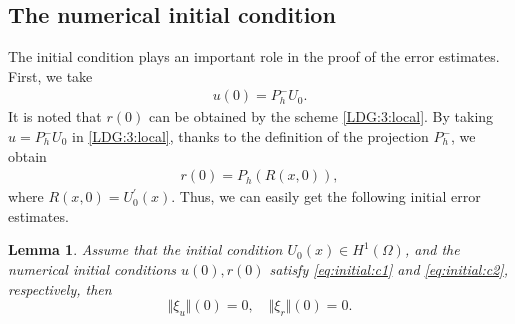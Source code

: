 \documentclass[11pt]{article}
\newcommand{\norm}   [1] {\Vert#1\Vert}
\newtheorem{lemma}{Lemma}[section]
\numberwithin{equation}{section}
\begin{document}
\subsection{The numerical initial condition}
The initial condition plays an important role in the proof of the error estimates. First, we take
\begin{align}
u(0)=P_h^-U_0.\label{eq:initial:c1}
\end{align}
It is noted that $r(0)$ can be obtained by the scheme \eqref{LDG:3:local}. By taking $u=P_h^-U_0$ in \eqref{LDG:3:local}, thanks to the definition of the projection $P_h^-$, we obtain
\begin{align}
r(0)=P_h(R(x,0)),\label{eq:initial:c2}
\end{align}
where $R(x,0)= U_0^{\prime}(x)$. Thus, we can easily get the following initial error estimates.
\begin{lemma}\label{lemma:initial}
	Assume that the initial condition $U_0(x) \in H^{1}(\Omega)$, and the numerical initial conditions  $u(0), r(0)$ satisfy \eqref{eq:initial:c1} and \eqref{eq:initial:c2}, respectively, then
	\begin{equation}
		\norm{\xi_u}(0)=0,\quad \norm{\xi_r}(0)=0.%
	\end{equation}
\end{lemma}
\end{document}
